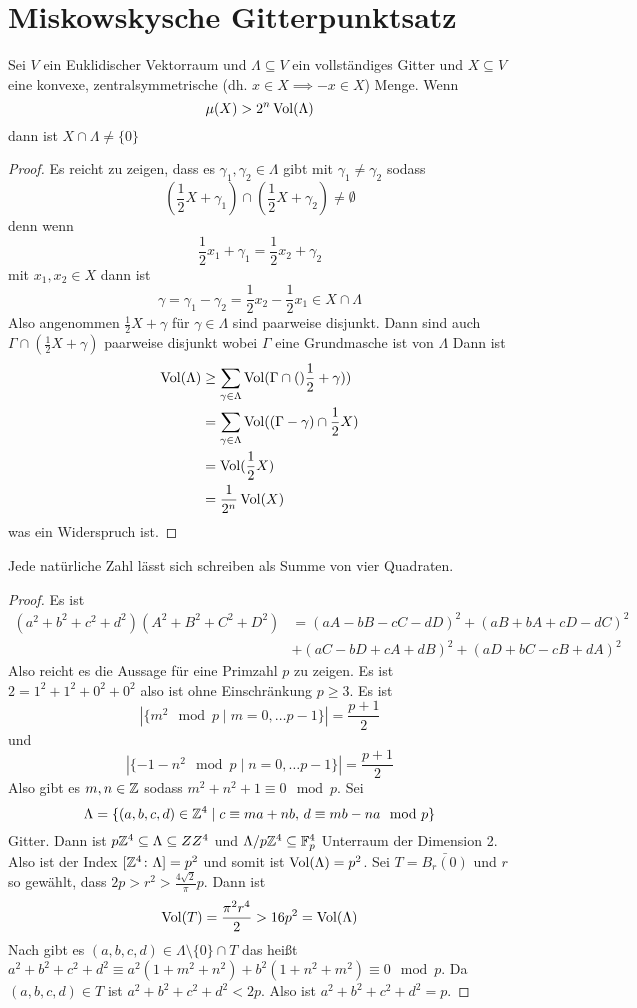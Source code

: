 \section{Miskowskysche Gitterpunktsatz}
\begin{Satz}[Gitterpunktsatz] \label{Satz:Gitterpunktsatz}
	
	Sei \(V\) ein Euklidischer Vektorraum und \(\Lambda\subseteq V\) ein vollständiges Gitter und \(X\subseteq V\) eine konvexe, zentralsymmetrische (dh. \(x\in X\implies -x\in X\)) Menge.
	Wenn \[\mu(X)>2^n\operatorname{Vol}(\Lambda)\] dann ist \(X\cap \Lambda\neq\{0\}\)
\end{Satz}
\begin{proof}
	Es reicht zu zeigen, dass es \(\gamma_1,\gamma_2\in \Lambda\) gibt mit \(\gamma_1\neq\gamma_2\) sodass
	\[(\frac 1 2 X+\gamma_1)\cap(\frac 1 2 X+\gamma_2)\neq \emptyset\] denn wenn
	\[\frac 1 2 x_1+\gamma_1=\frac 1 2 x_2+\gamma_2\] mit \(x_1,x_2\in X\) dann ist 
	\[\gamma=\gamma_1-\gamma_2=\frac 1 2 x_2-\frac 1 2 x_1\in X\cap \Lambda\]
	Also angenommen \(\frac 1 2 X+\gamma\) für \(\gamma\in\Lambda\) sind paarweise disjunkt.
	Dann sind auch \(\Gamma\cap (\frac 1 2 X+\gamma)\) paarweise disjunkt wobei \(\Gamma\) eine Grundmasche ist von \(\Lambda\)
	Dann ist 
	\begin{align*}
		\operatorname{Vol}(\Lambda)&\geq \sum_{\gamma\in \Lambda}\operatorname{Vol}(\Gamma\cap() \frac 1 2 +\gamma))\\
		&=\sum_{\gamma\in\Lambda}\operatorname{Vol}((\Gamma-\gamma)\cap \frac 1 2 X)\\
		&= \operatorname{Vol}(\frac 1 2 X)\\
		&= \frac{1}{2^n}\operatorname{Vol}(X)
	\end{align*} was ein Widerspruch ist.
\end{proof}
\begin{Kor}
	Jede natürliche Zahl lässt sich schreiben als Summe von vier Quadraten.
\end{Kor}
\begin{proof}
	Es ist 
	\begin{align*}
	(a^2+b^2+c^2+d^2)(A^2+B^2+C^2+D^2)&=(aA-bB-cC-dD)^2+
	(aB+bA+cD-dC)^2\\&+(aC-bD+cA+dB)^2+(aD+bC-cB+dA)^2
	\end{align*}
	Also reicht es die Aussage für eine Primzahl \(p\) zu zeigen.
	Es ist \(2=1^2+1^2+0^2+0^2\) also ist ohne Einschränkung \(p\geq 3\).
	Es ist \[|\{m^2 \mod p\mid m=0,\dots p-1\}|=\frac{p+1}{2}\] und
	\[|\{-1-n^2 \mod p\mid n=0,\dots p-1\}|=\frac{p+1}{2}\]
	Also gibt es \(m,n\in\mathbb{Z}\) sodass \(m^2+n^2+1\equiv 0 \mod p\).
	Sei \[\Lambda=\{(a,b,c,d)\in\mathbb{Z}^4\mid c\equiv ma+nb,\, d\equiv mb-na \mod p\}\] Gitter.
	Dann ist \(p\mathbb{Z}^4\subseteq \Lambda\subseteq ZZ^4\)
	und \(\Lambda/p\mathbb{Z}^4\subseteq \mathbb{F}_p^4\) Unterraum der Dimension 2.
	Also ist der Index \([\mathbb{Z}^4\colon \Lambda]=p^2\)
	und somit ist \(\operatorname{Vol}(\Lambda)=p^2\).
	Sei \(T=\bar{B_r(0)}\) und \(r\) so gewählt, dass \(2p>r^2>\frac{4\sqrt{2}}{\pi}p\).
	Dann ist
	\[\operatorname{Vol}(T)=\frac{\pi^2r^4}{2}>16p^2=\operatorname{Vol}(\Lambda)\]
	Nach  gibt es \((a,b,c,d)\in \Lambda\setminus\{0\}\cap T\) das heißt
	\(a^2+b^2+c^2+d^2\equiv a^2(1+m^2+n^2)+b^2(1+n^2+m^2)\equiv 0 \mod p\).
	Da \((a,b,c,d)\in T\) ist \(a^2+b^2+ c^2+ d^2<2p\).
	Also ist \(a^2+b^2+c^2+d^2=p\).
\end{proof}
